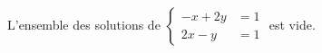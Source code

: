 L'ensemble des solutions de $\begin{cases} -x+2y &= 1 \\ 2x-y &= 1 \end{cases}$ est vide.

\begin{reponses}
\end{reponses}

